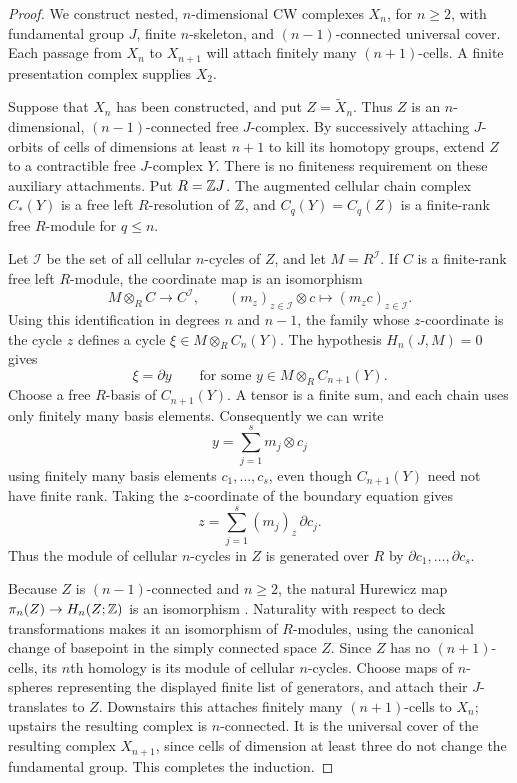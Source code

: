 \begin{proof}
We construct nested, $n$-dimensional CW complexes $X_n$, for
$n\ge2$, with fundamental group $J$, finite $n$-skeleton, and
$(n-1)$-connected universal cover.  Each passage from $X_n$ to
$X_{n+1}$ will attach finitely many $(n+1)$-cells.  A finite
presentation complex supplies $X_2$.

Suppose that $X_n$ has been constructed, and put
$Z=\widetilde X_n$.  Thus $Z$ is an $n$-dimensional,
$(n-1)$-connected free $J$-complex.  By successively attaching
$J$-orbits of cells of dimensions at least $n+1$ to kill its
homotopy groups, extend $Z$ to a contractible free $J$-complex $Y$.
There is no finiteness requirement on these auxiliary attachments.
Put $R=\mathbb Z J$.  The augmented cellular chain complex $C_*(Y)$ is a
free left $R$-resolution of $\mathbb Z$, and $C_q(Y)=C_q(Z)$ is a
finite-rank free $R$-module for $q\le n$.

Let $\mathcal I$ be the set of all cellular $n$-cycles of $Z$, and
let $M=R^{\mathcal I}$.  If $C$ is a finite-rank free left
$R$-module, the coordinate map is an isomorphism
\begin{equation}\label{eq:finite-rank-product-tensor}
 M\otimes_R C\longrightarrow C^{\mathcal I},
 \qquad (m_z)_{z\in\mathcal I}\otimes c
       \longmapsto(m_zc)_{z\in\mathcal I}.
\end{equation}
Using this identification in degrees $n$ and $n-1$, the family
whose $z$-coordinate is the cycle $z$ defines a cycle
$\xi\in M\otimes_R C_n(Y)$.  The hypothesis $H_n(J,M)=0$ gives
\[
 \xi=\partial y
 \qquad\text{for some }y\in M\otimes_R C_{n+1}(Y).
\]
Choose a free $R$-basis of $C_{n+1}(Y)$.  A tensor is a finite sum,
and each chain uses only finitely many basis elements.  Consequently
we can write
\[
 y=\sum_{j=1}^s m_j\otimes c_j
\]
using finitely many basis elements $c_1,\ldots,c_s$, even though
$C_{n+1}(Y)$ need not have finite rank.  Taking the $z$-coordinate
of the boundary equation gives
\[
 z=\sum_{j=1}^s (m_j)_z\,\partial c_j.
\]
Thus the module of cellular $n$-cycles in $Z$ is generated over
$R$ by $\partial c_1,\ldots,\partial c_s$.

Because $Z$ is $(n-1)$-connected and $n\ge2$, the natural Hurewicz map
$\pi_n(Z)\to H_n(Z;\mathbb Z)$ is an isomorphism
\cite[Theorem~4.37 and p.~370]{Hatcher2002}.  Naturality with respect to
deck transformations makes it an isomorphism of $R$-modules, using the
canonical change of basepoint in the simply connected space $Z$.
Since $Z$ has no $(n+1)$-cells, its $n$th homology is its module of
cellular $n$-cycles.  Choose maps of $n$-spheres representing the displayed
finite list of generators, and attach their $J$-translates to $Z$.
Downstairs this attaches finitely many $(n+1)$-cells to $X_n$;
upstairs the resulting complex is $n$-connected.  It is the
universal cover of the resulting complex $X_{n+1}$, since cells of
dimension at least three do not change the fundamental group.
This completes the induction.


\end{proof}
